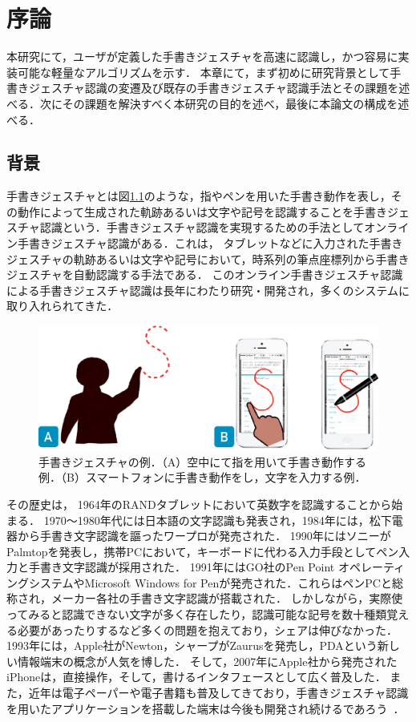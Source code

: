 \chapter{序論}
本研究にて，ユーザが定義した手書きジェスチャを高速に認識し，かつ容易に実装可能な軽量なアルゴリズムを示す．
本章にて，まず初めに研究背景として手書きジェスチャ認識の変遷及び既存の手書きジェスチャ認識手法とその課題を述べる．次にその課題を解決すべく本研究の目的を述べ，最後に本論文の構成を述べる．

\section{背景}
手書きジェスチャとは図\ref{fig:handwriting}のような，指やペンを用いた手書き動作を表し，その動作によって生成された軌跡あるいは文字や記号を認識することを手書きジェスチャ認識という．手書きジェスチャ認識を実現するための手法としてオンライン手書きジェスチャ認識がある．これは，
タブレットなどに入力された手書きジェスチャの軌跡あるいは文字や記号において，時系列の筆点座標列から手書きジェスチャを自動認識する手法である．
このオンライン手書きジェスチャ認識による手書きジェスチャ認識は長年にわたり研究・開発され，多くのシステムに取り入れられてきた．

\begin{figure} [htbp]
\centering
\includegraphics [width=0.5\columnwidth]{img/handwriting.eps}
\caption{手書きジェスチャの例．（A）空中にて指を用いて手書き動作する例．（B）スマートフォンに手書き動作をし，文字を入力する例．}
\label{fig:handwriting}
\end{figure}


その歴史は，
1964年のRANDタブレットにおいて英数字を認識することから始まる．
1970〜1980年代には日本語の文字認識も発表され，1984年には，松下電器から手書き文字認識を謳ったワープロが発売された．
1990年にはソニーがPalmtopを発表し，携帯PCにおいて，キーボードに代わる入力手段としてペン入力と手書き文字認識が採用された．
1991年にはGO社のPen Point オペレーティングシステムやMicrosoft Windows for Penが発売された．これらはペンPCと総称され，メーカー各社の手書き文字認識が搭載された．
しかしながら，実際使ってみると認識できない文字が多く存在したり，認識可能な記号を数十種類覚える必要があったりするなど多くの問題を抱えており，シェアは伸びなかった．
1993年には，Apple社がNewton，シャープがZaurusを発売し，PDAという新しい情報端末の概念が人気を博した．
そして，2007年にApple社から発売されたiPhoneは，直接操作，そして，書けるインタフェースとして広く普及した．
また，近年は電子ペーパーや電子書籍も普及してきており，手書きジェスチャ認識を用いたアプリケーションを搭載した端末は今後も開発され続けるであろう~\cite{110009437469}．

